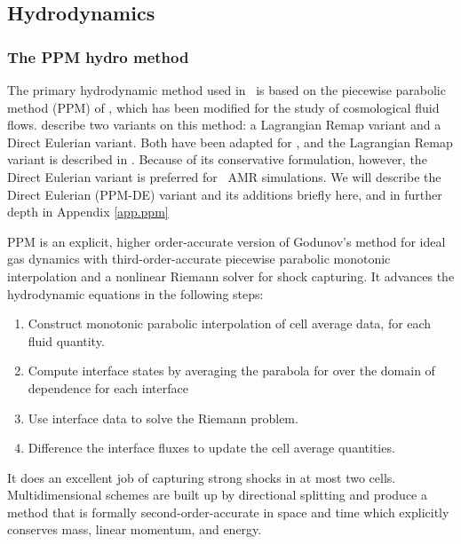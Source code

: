 \subsection{Hydrodynamics}\label{sec.ov.hydro}

\subsubsection{The PPM hydro method}\label{sec.ov.hydro.ppm}


The primary hydrodynamic method used in \enzo\ is based on the
piecewise parabolic method (PPM) of
\citet{1984JCoPh..54..174C}, which has been
modified for the study of cosmological fluid flows.  
\citet{1984JCoPh..54..174C} describe two variants on this method: a
Lagrangian Remap variant and a Direct Eulerian variant.  Both have
been adapted for \enzo, and the Lagrangian Remap 
variant is described in \citet{1995CoPhC..89..149B}.  Because of its
conservative formulation, however, the Direct Eulerian variant is
preferred for \enzo\ AMR simulations.  We will describe the Direct
Eulerian (PPM-DE) variant and its additions briefly here, and in
further depth in Appendix \ref{app.ppm} 


PPM is an explicit, higher order-accurate version of
Godunov's method for ideal gas dynamics with third-order-accurate piecewise parabolic
monotonic interpolation and a nonlinear Riemann solver for shock
capturing.  It advances the hydrodynamic equations in the following
steps:
\begin{enumerate}
 \item Construct monotonic parabolic interpolation of cell average
 data, for each fluid quantity.
 \item Compute interface states by averaging the parabola for over the domain of dependence for
 each interface
 \item Use interface data to solve the Riemann problem.
 \item Difference the interface fluxes to update the cell average quantities.
\end{enumerate}
It does an excellent job of capturing strong shocks in at
most two cells.  Multidimensional schemes are built up by directional
splitting and produce a method that is formally second-order-accurate
in space and time which explicitly conserves mass, linear momentum, and energy.  

